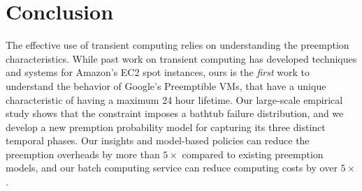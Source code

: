 
\vspace*{\subsecspace}
\section{Conclusion}
\label{sec:conclusion}
The effective use of transient computing relies on understanding the preemption characteristics.
While past work on transient computing has developed techniques and systems for Amazon's EC2 spot instances, ours is the \emph{first} work to understand the behavior of Google's Preemptible VMs, that have a unique characteristic of having a maximum 24 hour lifetime.
Our large-scale empirical study shows that the constraint imposes a bathtub failure distribution, and we develop a new premption probability model for capturing its three distinct temporal phases. 
Our insights and model-based policies can reduce the preemption overheads by more than $5\times$ compared to existing preemption models, and our batch computing service can reduce computing costs by over $5\times$. 



